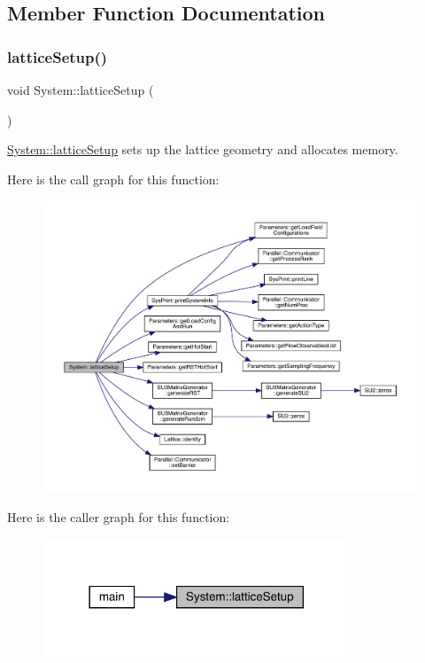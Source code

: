 \subsection{Member Function Documentation}
\mbox{\label{class_system_a93c8a8258ac8f6382ec393bca1271011}} 
\subsubsection{\texorpdfstring{latticeSetup()}{latticeSetup()}}
{\footnotesize\ttfamily void System\+::lattice\+Setup (\begin{DoxyParamCaption}{ }\end{DoxyParamCaption})}



\mbox{\hyperlink{class_system_a93c8a8258ac8f6382ec393bca1271011}{System\+::lattice\+Setup}} sets up the lattice geometry and allocates memory. 

Here is the call graph for this function\+:\nopagebreak
\begin{figure}[H]
\begin{center}
\leavevmode
\includegraphics[width=350pt]{class_system_a93c8a8258ac8f6382ec393bca1271011_cgraph}
\end{center}
\end{figure}
Here is the caller graph for this function\+:\nopagebreak
\begin{figure}[H]
\begin{center}
\leavevmode
\includegraphics[width=261pt]{class_system_a93c8a8258ac8f6382ec393bca1271011_icgraph}
\end{center}
\end{figure}
\mbox{\label{class_system_afa39feb75f96798930f4bfb48205f40b}} 
